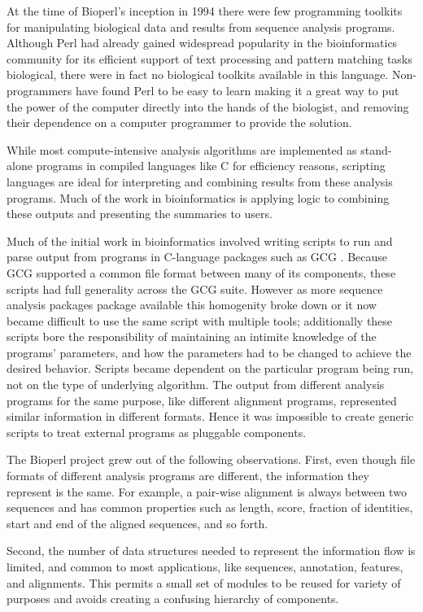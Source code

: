 \documentclass[12pt]{article}
\begin{document}
At the time of Bioperl's inception in 1994 \cite{chervitz-bits} there
were few programming toolkits for manipulating biological data and
results from sequence analysis programs.  Although Perl had already
gained widespread popularity in the bioinformatics community for its
efficient support of text processing and pattern matching tasks
biological, there were in fact no biological toolkits available in
this language.  Non-programmers have found Perl to be easy to learn
making it a great way to put the power of the computer directly into
the hands of the biologist, and removing their dependence on a
computer programmer to provide the solution.

While most compute-intensive analysis algorithms are implemented as
stand-alone programs in compiled languages like C for efficiency
reasons, scripting languages are ideal for interpreting and combining
results from these analysis programs.  Much of the work in
bioinformatics is applying logic to combining these outputs and
presenting the summaries to users.  
 
Much of the initial work in bioinformatics involved writing scripts to
run and parse output from programs in C-language packages such as GCG
\cite{Devereux1984}. Because GCG supported a common file format
between many of its components, these scripts had full generality
across the GCG suite.  However as more sequence analysis packages
package available this homogenity broke down or it now became
difficult to use the same script with multiple tools; additionally
these scripts bore the responsibility of maintaining an intimite
knowledge of the programs' parameters, and how the parameters had to
be changed to achieve the desired behavior.  Scripts became dependent
on the particular program being run, not on the type of underlying
algorithm.  The output from different analysis programs for the same
purpose, like different alignment programs, represented similar
information in different formats.  Hence it was impossible to create
generic scripts to treat external programs as pluggable components.

The Bioperl project grew out of the following observations.  First,
even though file formats of different analysis programs are different,
the information they represent is the same.  For example, a pair-wise alignment
is always between two sequences and has common properties such as
length, score, fraction of identities, start and end of the aligned
sequences, and so forth. 

Second, the number of data structures needed to represent the
information flow is limited, and common to most applications, like
sequences, annotation, features, and alignments.  This permits a small
set of modules to be reused for variety of purposes and avoids
creating a confusing hierarchy of components.
\end{document}
